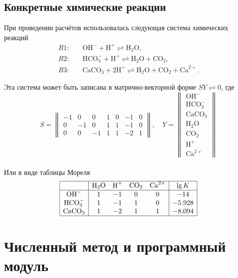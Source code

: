 \documentclass[14pt,a4paper]{extarticle}
\begin{document}
\subsection{Конкретные химические реакции}

\newcommand{\OHm}{\text{OH}^-}
\newcommand{\Hp}{\text{H}^+}
\newcommand{\WAT}{\text{H}_2\text{O}}
\newcommand{\CARB}{\text{CO}_2}
\newcommand{\Catwop}{\text{Ca}^{2+}}
\newcommand{\Calcite}{\text{CaCO}_3}
\newcommand{\HCO}{\text{HCO}_3^{-}}
При проведении расчётов использовалась следующая система химических реакций
\begin{align*}
R1:&\quad \OHm + \Hp \rightleftharpoons \WAT,\\
R2:&\quad \HCO +\Hp \rightleftharpoons \WAT + \CARB,\\
R3:&\quad \Calcite + 2\Hp \rightleftharpoons \WAT + \CARB + \Catwop.
\end{align*}

Эта  система может быть записана в матрично-векторной форме $SY \rightleftharpoons 0$, где
$$S =  \begin{Vmatrix}
-1 &0 &0  &1 &0 &-1 &0\\
0 &-1 &0  &1 &1 &-1 &0\\
0  &0 &-1  &1 &1 &-2 &1
		\end{Vmatrix}, \quad
  Y = \begin{Vmatrix}
  \OHm\\
  \HCO\\
  \Calcite\\
  \WAT\\
  \CARB\\
  \Hp\\
  \Catwop
  \end{Vmatrix}$$\\
Или в виде таблицы Мореля\\
$$\begin{array}{|c|cccc|c|}
\hline
		&\WAT	&\Hp	&\CARB	&\Catwop	&\lg {K}\\
\hline
\OHm		&1		&-1		&0		  &0		&-14\\
\HCO	&1		&-1		&1		  &0		&-5.928\\
\Calcite		&1		&-2		&1		  &1		&-8.094\\
\hline
\end{array}$$

\section{Численный метод и программный модуль}
\end{document}
